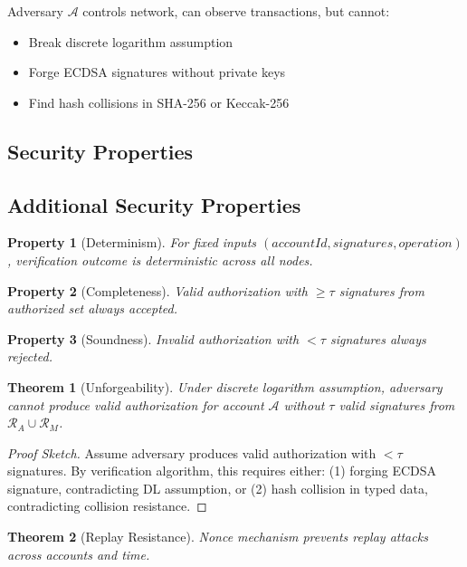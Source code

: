 \documentclass[10pt,twocolumn]{article}
\newtheorem{theorem}{Theorem}
\newtheorem{property}{Property}
\begin{document}
{Adversary $\mathcal{A}$ controls network, can observe transactions, but cannot:
\begin{itemize}[leftmargin=*,topsep=2pt,itemsep=1pt]
\item Break discrete logarithm assumption
\item Forge ECDSA signatures without private keys
\item Find hash collisions in SHA-256 or Keccak-256
\end{itemize}

\subsection{Security Properties}

\subsection{Additional Security Properties}

\begin{property}[Determinism]
For fixed inputs $(accountId, signatures, operation)$, verification outcome is deterministic across all nodes.
\end{property}

\begin{property}[Completeness]
Valid authorization with $\geq \tau$ signatures from authorized set always accepted.
\end{property}

\begin{property}[Soundness]
Invalid authorization with $< \tau$ signatures always rejected.
\end{property}


\begin{theorem}[Unforgeability]
Under discrete logarithm assumption, adversary cannot produce valid authorization for account $\mathcal{A}$ without $\tau$ valid signatures from $\mathcal{R}_A \cup \mathcal{R}_M$.
\end{theorem}

\begin{proof}[Proof Sketch]
Assume adversary produces valid authorization with $< \tau$ signatures. By verification algorithm, this requires either: (1) forging ECDSA signature, contradicting DL assumption, or (2) hash collision in typed data, contradicting collision resistance.
\end{proof}

\begin{theorem}[Replay Resistance]
Nonce mechanism prevents replay attacks across accounts and time.
\end{theorem}


}
\end{document}
